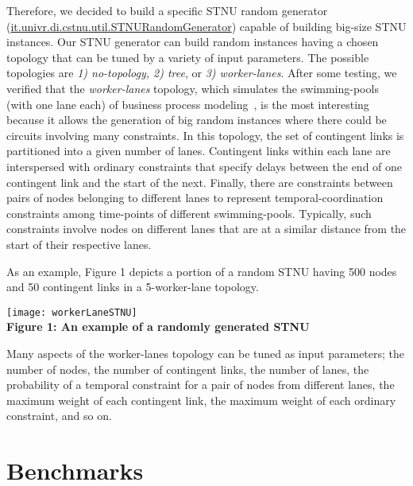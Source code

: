 \documentclass[a4paper,11pt]{article}
\begin{document}
Therefore, we decided to build a specific STNU random generator (\href{http://profs.scienze.univr.it/~posenato/software/cstnu/apidocs/it/univr/di/cstnu/algorithms/STNURandomGenerator.html}{it.univr.di.cstnu.util.STNURandomGenerator}) capable of building big-size STNU instances.
Our STNU generator can build random instances having a chosen topology that can be tuned by a variety of input parameters.
The possible topologies are \textit{1) no-topology, 2) tree}, or \textit{3) worker-lanes}.
After some testing, we verified that the \textit{worker-lanes} topology, which simulates the swimming-pools (with one lane each) of business process modeling~\cite{bpmi}, is the most interesting because it allows the generation of big random instances where there could be circuits involving many constraints.
In this topology, the set of contingent links is partitioned into a given  number of lanes.
Contingent links within each lane are interspersed with ordinary constraints that
specify delays between the end of one contingent link and the start of the next.
Finally, there are constraints between pairs of nodes belonging to different lanes to represent temporal-coordination constraints among time-points of different swimming-pools.
Typically, such constraints involve nodes on different lanes that are at a similar distance from the start of their respective lanes.

As an example, Figure 1 depicts a portion of a random STNU having 500 nodes and 50 contingent links in a 5-worker-lane topology.
\begin{center}
\texttt{[image: workerLaneSTNU]}\\%
\textbf{Figure 1: An example of a randomly generated STNU}%
\end{center}

Many aspects of the worker-lanes topology can be tuned as input parameters;
the number of nodes, the number of contingent links, the number of lanes, the probability of a temporal constraint for a pair of nodes from different lanes, the maximum weight of each contingent link, the maximum weight of each ordinary constraint, and so on.



\section{Benchmarks}
\end{document}
